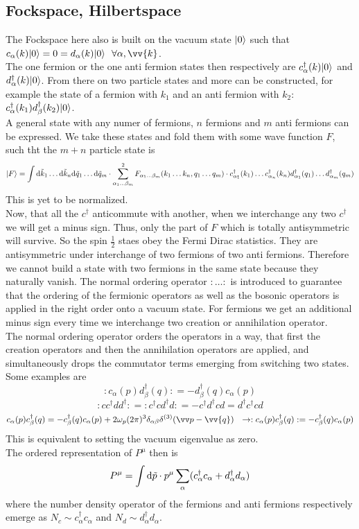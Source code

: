 \subsection{Fockspace, Hilbertspace}
The Fockspace here also is built on the vacuum state $|0 \rangle$ such that $c_\alpha(k)|0\rk = 0 = d_\alpha(k)|0\rk~~\forall \alpha,\vv{k}$.\\
The one fermion or the one anti fermion states then respectively are $c^\dagger_\alpha(k)|0\rangle$ and $ d_\alpha^\dagger(k)|0 \rangle$. From there on two particle states and more can be constructed, for example the state of a fermion with $k_1$ and an anti fermion with $k_2$: $c_\alpha^\dagger(k_1)d_\beta^\dagger(k_2)|0\rangle$.\\
A general state with any numer of fermions, $n$ fermions and $m$ anti fermions can be expressed. We take these states and fold them with some wave function $F$, such tht the $m+n$ particle state is 
\[ |F\rangle = \int {\rm d} \tilde k_1 \ldots {\rm d} \tilde k_n {\rm d} \tilde q_1 \ldots {\rm d} \tilde q_m \cdot \sum_{\alpha_1 \ldots \beta_m}^2 F_{\alpha_1\ldots\beta_m} (k_1\ldots k_n,q_1\ldots q_m) \cdot c_{\alpha_1}^\dagger(k_1)\ldots c_{\alpha_n}^\dagger(k_n) d_{\alpha_1}^\dagger(q_1)\ldots d_{\alpha_m}^\dagger(q_m)\]
This is yet to be normalized.\\
Now, that all the $c^\dagger$ anticommute with another, when we interchange any two $c^\dagger$ we will get a minus sign.
Thus, only the part of $F$ which is totally antisymmetric will survive.
So the spin $\frac{1}{2}$ staes obey the Fermi Dirac statistics. They are antisymmetric under interchange of two fermions of two anti fermions.
Therefore we cannot build a state with two fermions in the same state because they naturally vanish.
The normal ordering operator $: \ldots :$ is introduced to guarantee that the ordering of the fermionic operators as well as the bosonic operators is applied in the right order onto a vacuum state. 
For fermions we get an additional minus sign every time we interchange two creation or annihilation operator.\\
The normal ordering operator orders the operators in a way, that first the creation operators and then the annihilation operators are applied, and simultaneously drops the commutator terms emerging from switching two states.\\
Some examples are
\[ : c_\alpha(p)d_\beta^\dagger(q): = - d_\beta^\dagger(q) c_\alpha(p)\]
\[: c c^\dagger d d^\dagger: = : c^\dagger c d^\dagger d: =- c^\dagger d^\dagger c d = d^\dagger c^\dagger c d\]
\[c_\alpha(p) c_\beta^\dagger(q) = - c_\beta^\dagger(q) c_\alpha(p) + 2\omega_p (2\pi)^3 \delta_{\alpha\beta} \delta^{(3)}(\vp - \vv{q}) ~~\df :c_\alpha(p) c_\beta^\dagger(q): = - c_\beta^\dagger(q) c_\alpha(p)\]
This is equivalent to setting the vacuum eigenvalue as zero.\\
The ordered representation of $P^\mu $ then is
\[ P^\mu = \int {\rm d} \tilde p \cdot p ^\mu \sum_\alpha (c_\alpha^\dagger c_\alpha + d^\dagger_\alpha d_\alpha)\]
where the number density operator of the fermions and anti fermions respectively emerge as $N_c \sim c_\alpha^\dagger c_\alpha$ and $N_d \sim d_\alpha^\dagger d_\alpha$.


